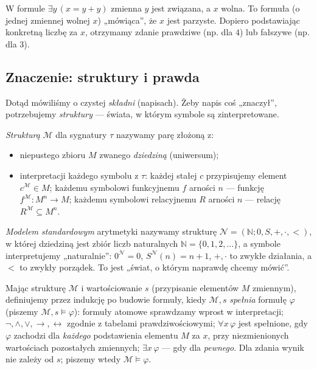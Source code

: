 \begin{przyklad}\label{res:2:12}
W formule $\exists y\,(x=y+y)$ zmienna $y$ jest związana, a $x$ wolna. To formuła (o jednej zmiennej wolnej $x$) „mówiąca”, że $x$ jest parzyste. Dopiero podstawiając konkretną liczbę za $x$, otrzymamy zdanie prawdziwe (np. dla $4$) lub fałszywe (np. dla $3$).
\end{przyklad}

\subsection*{Znaczenie: struktury i prawda}\label{sec:struktury-prawda}
Dotąd mówiliśmy o czystej \emph{składni} (napisach). Żeby napis coś „znaczył”, potrzebujemy \emph{struktury} --- świata, w którym symbole są zinterpretowane.

\begin{definicja}[Struktura]\label{res:2:13}
\emph{Strukturą} $\mathcal M$ dla sygnatury $\tau$ nazywamy parę złożoną z:
\begin{itemize}
\item niepustego zbioru $M$ zwanego \emph{dziedziną} (uniwersum);
\item interpretacji każdego symbolu z $\tau$: każdej stałej $c$ przypisujemy element $c^{\mathcal M}\in M$; każdemu symbolowi funkcyjnemu $f$ arności $n$ --- funkcję $f^{\mathcal M}:M^n\to M$; każdemu symbolowi relacyjnemu $R$ arności $n$ --- relację $R^{\mathcal M}\subseteq M^n$.
\end{itemize}
\end{definicja}

\begin{przyklad}\label{res:2:14}
\emph{Modelem standardowym} arytmetyki nazywamy strukturę $\mathcal N=(\mathbb N;0,S,+,\cdot,<)$, w której dziedziną jest zbiór liczb naturalnych $\mathbb N=\{0,1,2,\ldots\}$, a symbole interpretujemy „naturalnie”: $0^{\mathcal N}=0$, $S^{\mathcal N}(n)=n+1$, $+,\cdot$ to zwykłe działania, a $<$ to zwykły porządek. To jest „świat, o którym naprawdę chcemy mówić”.
\end{przyklad}

\begin{definicja}\label{res:2:15}
Mając strukturę $\mathcal M$ i wartościowanie $s$ (przypisanie elementów $M$ zmiennym), definiujemy przez indukcję po budowie formuły, kiedy $\mathcal M,s$ \emph{spełnia} formułę $\varphi$ (piszemy $\mathcal M,s\models\varphi$): formuły atomowe sprawdzamy wprost w interpretacji; $\neg,\land,\lor,\to,\leftrightarrow$ zgodnie z tabelami prawdziwościowymi; $\forall x\,\varphi$ jest spełnione, gdy $\varphi$ zachodzi dla \emph{każdego} podstawienia elementu $M$ za $x$, przy niezmienionych wartościach pozostałych zmiennych; $\exists x\,\varphi$ --- gdy dla \emph{pewnego}. Dla zdania wynik nie zależy od $s$; piszemy wtedy $\mathcal M\models\varphi$.
\end{definicja}

